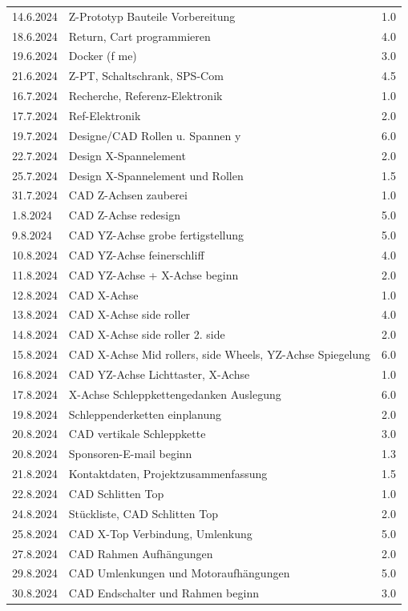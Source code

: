 \begin{longtable}{|l|p{10cm}|r|}
14.6.2024	&Z-Prototyp Bauteile Vorbereitung& 1.0\\
18.6.2024	&Return, Cart programmieren	&4.0\\
19.6.2024	&Docker (f me)	&3.0\\
21.6.2024	&Z-PT, Schaltschrank, SPS-Com&	4.5\\
16.7.2024	&Recherche, Referenz-Elektronik&	1.0\\
17.7.2024	&Ref-Elektronik	&2.0\\
19.7.2024	&Designe/CAD Rollen u. Spannen y &6.0\\
22.7.2024	&Design X-Spannelement	&2.0\\
25.7.2024	&Design X-Spannelement und Rollen	&1.5\\
31.7.2024	&CAD Z-Achsen zauberei &	1.0\\
1.8.2024	&CAD Z-Achse redesign & 5.0\\
9.8.2024	&CAD YZ-Achse grobe fertigstellung&	5.0\\
10.8.2024	&CAD YZ-Achse feinerschliff	&4.0\\
11.8.2024	&CAD YZ-Achse + X-Achse beginn&	2.0\\
12.8.2024	&CAD X-Achse	&1.0\\
13.8.2024	&CAD X-Achse side roller	&4.0\\
14.8.2024	&CAD X-Achse side roller 2. side	&2.0\\
15.8.2024	&CAD X-Achse Mid rollers, side Wheels, YZ-Achse Spiegelung	&6.0\\
16.8.2024	&CAD YZ-Achse Lichttaster, X-Achse	&1.0\\
17.8.2024	&X-Achse Schleppkettengedanken Auslegung	&6.0\\
19.8.2024	&Schleppenderketten einplanung	&2.0\\
20.8.2024	&CAD vertikale Schleppkette &3.0\\
20.8.2024	&Sponsoren-E-mail beginn	&1.3\\
21.8.2024	&Kontaktdaten, Projektzusammenfassung	&1.5\\
22.8.2024	&CAD Schlitten Top 	&1.0\\
24.8.2024	&Stückliste, CAD Schlitten Top	&2.0\\
25.8.2024	&CAD X-Top Verbindung, Umlenkung	&5.0\\
27.8.2024	&CAD Rahmen Aufhängungen	&2.0\\
29.8.2024	&CAD Umlenkungen und Motoraufhängungen	&5.0\\
30.8.2024	&CAD Endschalter und Rahmen beginn	&3.0\\

\end{longtable}
